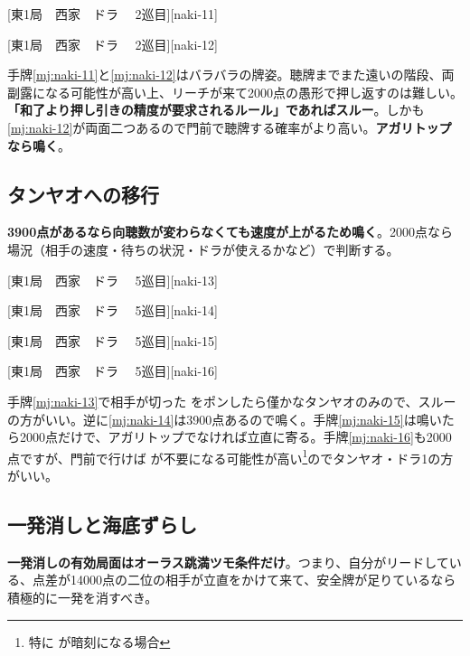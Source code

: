\documentclass[10pt, twocolumn]{article}
\newlength\stdbls %
\newcommand{\mjfn}[1]{\raisebox{-.135\stdbls}{\mahjong[0.75\stdbls]{#1}}}
\begin{document}
[東1局　西家　ドラ 　2巡目][naki-11]

[東1局　西家　ドラ 　2巡目][naki-12]

手牌\ref{mj:naki-11}と\ref{mj:naki-12}はバラバラの牌姿。聴牌までまた遠いの階段、両副露になる可能性が高い上、リーチが来て2000点の愚形で押し返すのは難しい。\textbf{「和了より押し引きの精度が要求されるルール」であればスルー}\citep[][p.~124]{hirasawa-naki}。しかも\ref{mj:naki-12}が両面二つあるので門前で聴牌する確率がより高い。\textbf{アガリトップなら鳴く}\citep[][p.~123]{hirasawa-naki}。

\subsection{タンヤオへの移行}

\textbf{3900点があるなら向聴数が変わらなくても速度が上がるため鳴く}\citep[][pp.~127--128]{hirasawa-naki}。2000点なら場況（相手の速度・待ちの状況・ドラが使えるかなど）で判断する。

[東1局　西家　ドラ 　5巡目][naki-13]

[東1局　西家　ドラ 　5巡目][naki-14]

[東1局　西家　ドラ 　5巡目][naki-15]

[東1局　西家　ドラ 　5巡目][naki-16]

手牌\ref{mj:naki-13}で相手が切った  をポンしたら僅かなタンヤオのみので、スルーの方がいい。逆に\ref{mj:naki-14}は3900点あるので鳴く。手牌\ref{mj:naki-15}は鳴いたら2000点だけで、アガリトップでなければ立直に寄る。手牌\ref{mj:naki-16}も2000点ですが、門前で行けば  が不要になる可能性が高い\footnote{特に \mjfn{9p37s} が暗刻になる場合}のでタンヤオ・ドラ1の方がいい。

\subsection{一発消しと海底ずらし}

\textbf{一発消しの有効局面はオーラス跳満ツモ条件だけ}\citep[][p.~188]{hirasawa-naki}。つまり、自分がリードしている、点差が14000点の二位の相手が立直をかけて来て、安全牌が足りているなら積極的に一発を消すべき。

\begin{rittai}[h]
  \centering
  
  
  \caption{海底ずらしの場合}
  \label{rittai:haitei}
\end{rittai}
\end{document}
